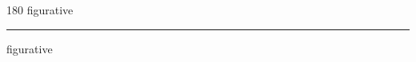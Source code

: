 
\begin{frame}
\begin{center}
\begin{turn}{180}
{\fontsize{2.5cm}{1em}\selectfont figurative}
\end{turn}
\vspace{1em}\par  
\hrule
\vspace{1em}\par  
{\fontsize{2.5cm}{1em}\selectfont figurative}
\end{center}
\end{frame}
